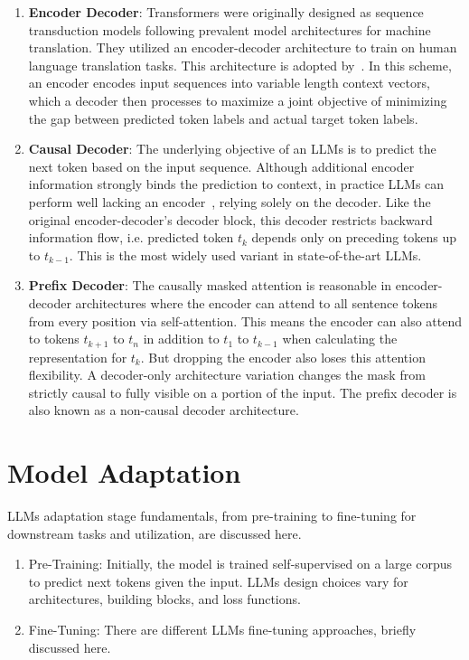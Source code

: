 \documentclass[a4paper,oneside]{book}
\begin{document}
\begin{enumerate}
    \item \textbf{Encoder Decoder}: Transformers were originally designed as sequence transduction models following prevalent model architectures for machine translation. They utilized an encoder-decoder architecture to train on human language translation tasks. This architecture is adopted by~\cite{raffel2020exploring, tay2022unifying}. In this scheme, an encoder encodes input sequences into variable length context vectors, which a decoder then processes to maximize a joint objective of minimizing the gap between predicted token labels and actual target token labels.

    \item \textbf{Causal Decoder}: The underlying objective of an LLMs is to predict the next token based on the input sequence. Although additional encoder information strongly binds the prediction to context, in practice LLMs can perform well lacking an encoder~\cite{liu2018generating}, relying solely on the decoder. Like the original encoder-decoder's decoder block, this decoder restricts backward information flow, i.e. predicted token $t_k$ depends only on preceding tokens up to $t_{k-1}$. This is the most widely used variant in state-of-the-art LLMs.

    \item \textbf{Prefix Decoder}: The causally masked attention is reasonable in encoder-decoder architectures where the encoder can attend to all sentence tokens from every position via self-attention. This means the encoder can also attend to tokens $t_{k+1}$ to $t_n$ in addition to $t_1$ to $t_{k-1}$ when calculating the representation for $t_k$. But dropping the encoder also loses this attention flexibility. A decoder-only architecture variation changes the mask from strictly causal to fully visible on a portion of the input. The prefix decoder is also known as a non-causal decoder architecture.
\end{enumerate}

\section{Model Adaptation}
LLMs adaptation stage fundamentals, from pre-training to fine-tuning for downstream tasks and utilization, are discussed here.

\begin{enumerate}
    \item Pre-Training: Initially, the model is trained self-supervised on a large corpus to predict next tokens given the input. LLMs design choices vary for architectures, building blocks, and loss functions.

    \item Fine-Tuning: There are different LLMs fine-tuning approaches, briefly discussed here.
\end{enumerate}
\end{document}
